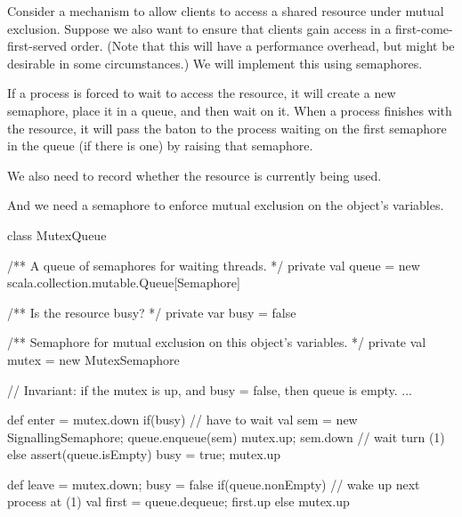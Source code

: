 
\begin{slide}

Consider a mechanism to allow clients to access a shared resource
under mutual exclusion.  Suppose we also want to ensure that clients
gain access in a first-come-first-served order.  (Note that this will have a
performance overhead, but might be desirable in some circumstances.)
%
We will implement this using semaphores. 

If a process is forced to wait to access the resource, it will create a new
semaphore, place it in a queue, and then wait on it.  When a process finishes
with the resource, it will pass the baton to the process waiting on the first
semaphore in the queue (if there is one) by raising that semaphore.

We also need to record whether the resource is currently being used.  

And we need a semaphore to enforce mutual exclusion on the object's variables.
\end{slide}


\begin{slide}

\begin{scala}
class MutexQueue{
  /** A queue of semaphores for waiting threads. */
  private val queue = new scala.collection.mutable.Queue[Semaphore]

  /** Is the resource busy? */
  private var busy = false

  /** Semaphore for mutual exclusion on this object's variables. */
  private val mutex = new MutexSemaphore

  // Invariant: if the mutex is up, and busy = false, then queue is empty.
  ...
}
\end{scala}
\end{slide}


\begin{slide}

\begin{scala}
  def enter = {
    mutex.down
    if(busy){ // have to wait
      val sem = new SignallingSemaphore; queue.enqueue(sem)
      mutex.up; sem.down                  // wait turn (1)
    }
    else assert(queue.isEmpty)
    busy = true; mutex.up
  }

  def leave = {
    mutex.down; busy = false
    if(queue.nonEmpty){                 // wake up next process at (1)
      val first = queue.dequeue; first.up
    }
    else mutex.up
  }
\end{scala}
\end{slide}

